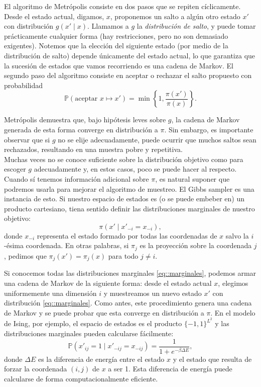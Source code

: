 \documentclass[a4paper, 12pt]{article}
\renewcommand{\P}{\mathbb{P}}
\begin{document}
El algoritmo de Metrópolis consiste en dos pasos que se repiten cíclicamente. Desde el estado actual, digamos, $x$, proponemos un salto a algún otro estado $x'$ con distribución $g( x' \mid x)$. Llamamos a $g$ la {\it distribución de salto}, y puede tomar prácticamente cualquier forma (hay restricciones, pero no son demasiado exigentes). Notemos que la elección del siguiente estado (por medio de la distribución de salto) depende únicamente del estado actual, lo que garantiza que la sucesión de estados que vamos recorriendo es una cadena de Markov. El segundo paso del algoritmo consiste en aceptar o rechazar el salto propuesto con probabilidad
\begin{equation}
    \label{eq::metropolis}
    \P( \text{aceptar }x \mapsto x') = \min \left\{ 1, \dfrac{\pi(x')}{\pi(x)} \right\}.
\end{equation}

Metrópolis demuestra que, bajo hipótesis leves sobre $g$, la cadena de Markov generada de esta forma converge en distribución a $\pi$. Sin embargo, es importante observar que si $g$ no se elije adecuadamente, puede ocurrir que muchos saltos sean rechazados, resultando en una muestra pobre y repetitiva.\\

Muchas veces no se conoce suficiente sobre la distribución objetivo como para escoger $g$ adecuadamente y, en estos casos, poco se puede hacer al respecto. Cuando sí tenemos información adicional sobre $\pi$, es natural suponer que podremos usarla para mejorar el algoritmo de muestreo. El Gibbs sampler es una instancia de esto. Si nuestro espacio de estados es (o se puede embeber en) un producto cartesiano, tiena sentido definir las distribuciones marginales de nuestro objetivo:
\begin{equation}
    \label{eq::marginales}
    \pi(x' \mid x'_{-i} = x_{-i}),
\end{equation}
donde $x_{-i}$ representa el estado formado por todas las coordenadas de $x$ salvo la $i$-ésima coordenada. En otras palabras, si $\pi_j$ es la proyección sobre la coordenada $j$, pedimos que $\pi_j(x') = \pi_j(x)$ para todo $j \neq i$.

Si conocemos todas las distribuciones marginales \eqref{eq::marginales}, podemos armar una cadena de Markov de la siguiente forma: desde el estado actual $x$, elegimos uniformemente una dimensión $i$ y muestreamos un nuevo estado $x'$ con distribución \eqref{eq::marginales}. Como antes, este procedimiento genera una cadena de Markov y se puede probar que esta converge en distribución a $\pi$. En el modelo de Ising, por ejemplo, el espacio de estados es el producto $\{ -1, 1 \}^{L^2}$ y las distribuciones marginales pueden calcularse fácilmente:
\begin{equation*}
    \P(x'_{ij} = 1 \mid x'_{-ij} = x_{-ij}) = \dfrac{1}{1 + e^{- \beta \Delta E}},
\end{equation*}
donde $\Delta E$ es la diferencia de energía entre el estado $x$ y el estado que resulta de forzar la coordenada $(i, j)$ de $x$ a ser 1. Esta diferencia de energía puede calcularse de forma computacionalmente eficiente.\\
\end{document}
